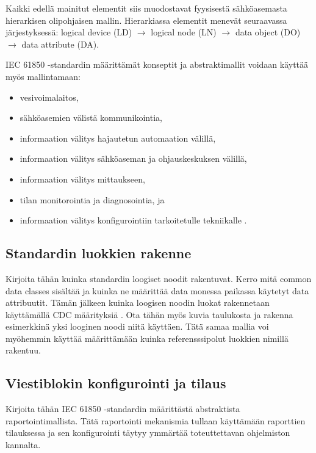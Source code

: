 Kaikki edellä mainitut elementit siis muodostavat fyysisestä sähköasemasta hierarkisen olipohjaisen mallin. Hierarkiassa elementit menevät seuraavassa järjestyksessä: logical device (LD) $\rightarrow$ logical node (LN) $\rightarrow$ data object (DO) $\rightarrow$ data attribute (DA).

IEC 61850 -standardin määrittämät konseptit ja abstraktimallit voidaan käyttää myös mallintamaan:
\begin{itemize}
	\item vesivoimalaitos,
	\item sähköasemien välistä kommunikointia,
	\item informaation välitys hajautetun automaation välillä,
	\item informaation välitys sähköaseman ja ohjauskeskuksen välillä,
	\item informaation välitys mittaukseen,
	\item tilan monitorointia ja diagnosointia, ja
	\item informaation välitys konfigurointiin tarkoitetulle tekniikalle \cite[s.~11]{IEC61850-7-1}.
\end{itemize}


\subsection{Standardin luokkien rakenne}
\begin{it}
	Kirjoita tähän kuinka standardin loogiset noodit rakentuvat. Kerro mitä common data classes sisältää ja kuinka ne määrittää data monessa paikassa käytetyt data attribuutit. Tämän jälkeen kuinka loogisen noodin luokat rakennetaan käyttämällä CDC määrityksiä \cite[s.~26]{IEC61850-1}. Ota tähän myös kuvia taulukosta ja rakenna esimerkkinä yksi looginen noodi niitä käyttäen. Tätä samaa mallia voi myöhemmin käyttää määrittämään kuinka referensssipolut luokkien nimillä rakentuu.
\end{it}

\subsection{Viestiblokin konfigurointi ja tilaus}
\begin{it}
	Kirjoita tähän IEC 61850 -standardin määrittästä abstraktista raportointimallista. Tätä raportointi mekanismia tullaan käyttämään raporttien tilauksessa ja sen konfigurointi täytyy ymmärtää toteuttettavan ohjelmiston kannalta.
\end{it}

